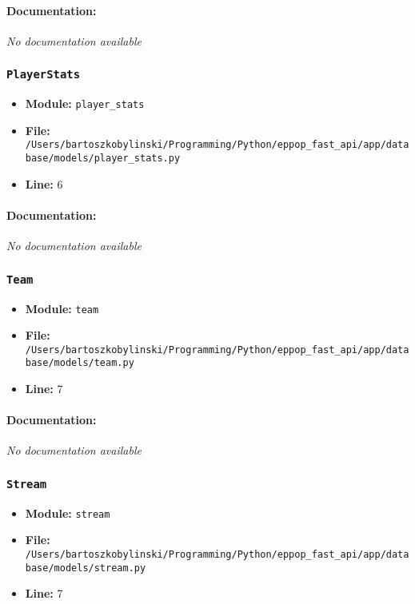 \documentclass[11pt,a4paper]{article}
\begin{document}
\paragraph{Documentation:} \textit{No documentation available}


\vspace{1em}
\subsubsection{\texttt{PlayerStats}}

\begin{itemize}
    \item \textbf{Module:} \texttt{player\_stats}
    \item \textbf{File:} \texttt{/Users/bartoszkobylinski/Programming/Python/eppop\_fast\_api/app/database/models/player\_stats.py}
    \item \textbf{Line:} 6
\end{itemize}

\paragraph{Documentation:} \textit{No documentation available}


\vspace{1em}
\subsubsection{\texttt{Team}}

\begin{itemize}
    \item \textbf{Module:} \texttt{team}
    \item \textbf{File:} \texttt{/Users/bartoszkobylinski/Programming/Python/eppop\_fast\_api/app/database/models/team.py}
    \item \textbf{Line:} 7
\end{itemize}

\paragraph{Documentation:} \textit{No documentation available}


\vspace{1em}
\subsubsection{\texttt{Stream}}

\begin{itemize}
    \item \textbf{Module:} \texttt{stream}
    \item \textbf{File:} \texttt{/Users/bartoszkobylinski/Programming/Python/eppop\_fast\_api/app/database/models/stream.py}
    \item \textbf{Line:} 7
\end{itemize}
\end{document}
